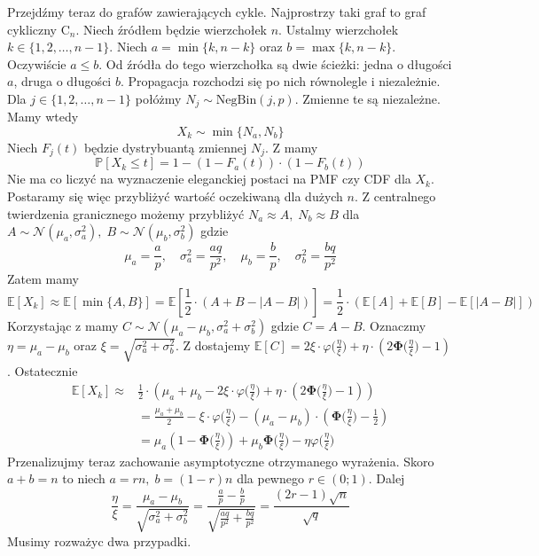Przejdźmy teraz do grafów zawierających cykle. Najprostrzy taki graf to graf cykliczny $\mathrm{C}_n$. Niech źródłem będzie wierzchołek $n$. Ustalmy wierzchołek $k\in\{1,2,\dots,n-1\}$. Niech $a=\min\{k,n-k\}$ oraz $b=\max\{k,n-k\}$. Oczywiście $a\le b$. Od źródła do tego wierzchołka są dwie ścieżki: jedna o długości $a$, druga o długości $b$. Propagacja rozchodzi się po nich równolegle i niezależnie. Dla $j\in \{1,2,\dots,n-1\} $ połóżmy $N_j\sim \mathrm{NegBin}(j,p)$. Zmienne te są niezależne. Mamy wtedy 
\[
    X_k \sim \min\{N_a, N_b\}
\]
Niech $F_j(t)$ będzie dystrybuantą zmiennej $N_j$. Z  mamy 
\[
    \mathbb{P}[X_k\le t] = 1 - (1-F_a(t))\cdot(1-F_b(t))
\]
Nie ma co liczyć na wyznaczenie eleganckiej postaci na PMF czy CDF dla $X_k$. 
Postaramy się więc przybliżyć wartość oczekiwaną dla dużych $n$. Z centralnego twierdzenia granicznego możemy przybliżyć $N_a \approx A,\; N_b \approx B$ dla $ A\sim \mathcal{N}(\mu_a,\sigma^2_a),\; B \sim \mathcal{N}(\mu_b,\sigma^2_b)$ gdzie 
\[
    \mu_a=\frac{a}{p},\quad \sigma^2_a=\frac{aq}{p^2}, \quad \mu_b=\frac{b}{p},\quad \sigma^2_b=\frac{bq}{p^2}
\]
Zatem mamy
\[
    \mathbb{E}[X_k] \approx \mathbb{E}[\min\{A,B\}]=\mathbb{E}[\frac{1}{2}\cdot(A+B-|A-B|)]=\frac{1}{2}\cdot (\mathbb{E}[A]+\mathbb{E}[B]-\mathbb{E}[|A-B|])
\]
Korzystając z  mamy $C \sim \mathcal{N}(\mu_a-\mu_b,\sigma_a^2+\sigma_b^2)$ gdzie $C=A-B$. Oznaczmy $\eta=\mu_a-\mu_b$ oraz $\xi=\sqrt{\sigma_a^2+\sigma_b^2}$. Z  dostajemy $\mathbb{E}[C]=2\xi\cdot \varphi\Big(\frac{\eta}{\xi}\Big)+\eta\cdot (2\mathbf{\Phi}\Big(\frac{\eta}{\xi}\Big)-1)$. Ostatecznie 
\begin{equation*}
\begin{aligned}
\mathbb{E}[X_k] \approx
& \frac{1}{2}\cdot (\mu_a+\mu_b-2\xi\cdot \varphi\Big(\frac{\eta}{\xi}\Big)+\eta\cdot (2\mathbf{\Phi}\Big(\frac{\eta}{\xi}\Big)-1)) \\
& = \frac{\mu_a+\mu_b}{2}-\xi\cdot \varphi\Big(\frac{\eta}{\xi}\Big)-(\mu_a-\mu_b)\cdot(\mathbf{\Phi}\Big(\frac{\eta}{\xi}\Big)-\frac{1}{2}) \\
&=\mu_a (1-\mathbf{\Phi}\Big(\frac{\eta}{\xi}\Big))+\mu_b\mathbf{\Phi}\Big(\frac{\eta}{\xi}\Big)-\eta\varphi\Big(\frac{\eta}{\xi}\Big)
\end{aligned}
\end{equation*}
Przenalizujmy teraz zachowanie asymptotyczne otrzymanego wyrażenia. Skoro $a+b=n$ to niech $a=rn, \; b=(1-r)n$ dla pewnego $r\in(0;1)$. Dalej 
\[
    \frac{\eta}{\xi}=\frac{\mu_a-\mu_b}{\sqrt{\sigma_a^2+\sigma_b^2}}=\frac{\frac{a}{p}-\frac{b}{p}}{\sqrt{\frac{aq}{p^2}+\frac{bq}{p^2}}}=\frac{(2r-1)\sqrt{n}}{\sqrt{q}}
\]
Musimy rozważyc dwa przypadki.

